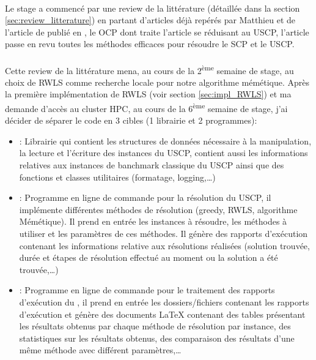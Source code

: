 \documentclass[a4paper,11pt,twoside,french,report]{../common/simplem}
\begin{document}
				\paragraph*{}
					Le stage a commencé par une review de la littérature (détaillée dans la section \ref{sec:review_litterature}) en partant d'articles déjà repérés par Matthieu et de l'article  de \citeauthor{Kritter2019} publié en \citeyear{Kritter2019}, le \gls{OCP} dont traite l'article se réduisant au \gls{USCP}, l'article passe en revu toutes les méthodes efficaces pour résoudre le \gls{SCP} et le \gls{USCP}.
				\paragraph*{}
					Cette review de la littérature mena, au cours de la 2\textsuperscript{ème} semaine de stage, au choix de \gls{RWLS} comme recherche locale pour notre algorithme mémétique. Après la première implémentation de \gls{RWLS} (voir section \ref{sec:impl_RWLS}) et ma demande d'accès au cluster \gls{HPC}, au cours de la 6\textsuperscript{ème} semaine de stage, j'ai décider de séparer le code en 3 cibles (1 librairie et 2 programmes):
					\begin{itemize}
						\item \common{}: Librairie qui contient les structures de données nécessaire à la manipulation, la lecture et l'écriture des instances du \gls{USCP}, contient aussi les informations relatives aux instances de banchmark classique du \gls{USCP} ainsi que des fonctions et classes utilitaires (formatage, logging,\ldots)
						\item \solver{}: Programme en ligne de commande pour la résolution du \gls{USCP}, il implémente différentes méthodes de résolution (greedy, \gls{RWLS}, algorithme Mémétique). Il prend en entrée les instances à résoudre, les méthodes à utiliser et les paramètres de ces méthodes. Il génère des rapports d'exécution contenant les informations relative aux résolutions réalisées (solution trouvée, durée et étapes de résolution effectué au moment ou la solution a été trouvée,\ldots)
						\item \printer{}: Programme en ligne de commande pour le traitement des rapports d'exécution du \solver{}, il prend en entrée les dossiers/fichiers contenant les rapports d'exécution et génère des documents \LaTeX{} contenant des tables présentant les résultats obtenus par chaque méthode de résolution par instance, des statistiques sur les résultats obtenus, des comparaison des résultats d'une même méthode avec différent paramètres,\ldots
					\end{itemize}
\end{document}
